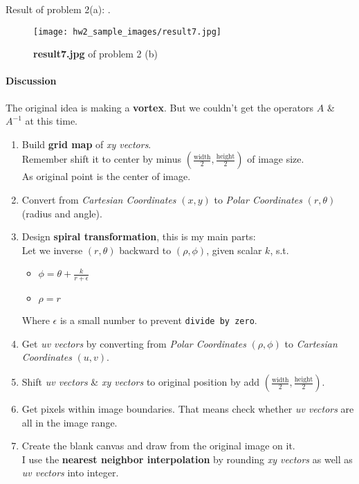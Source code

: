 Result of problem 2(a): .
\begin{figure}
    \centering
    \texttt{[image: hw2\_sample\_images/result7.jpg]}
    \caption{\textbf{result7.jpg} of problem 2 (b)}
    \label{result7}
\end{figure}

\paragraph{Discussion}

The original idea is making a \textbf{vortex}. But we couldn't get the operators $A$ \& $A^{-1}$ at this time.
\begin{enumerate}
    \item Build \textbf{grid map} of \textit{xy vectors}. \\
    Remember shift it to center by minus $(\frac{\mbox{width}}{2}, \frac{\mbox{height}}{2})$ of image size. \\
    As original point is the center of image.
    \item Convert from \textit{Cartesian Coordinates} $(x, y)$ to \textit{Polar Coordinates} $(r, \theta)$ (radius and angle).
    \item Design \textbf{spiral transformation}, this is my \alert{main parts}: \\
    Let we inverse $(r, \theta)$ backward to $(\rho, \phi)$, given scalar $k$, s.t.
    \begin{itemize}
        \item $\phi = \theta + \frac{k}{r + \epsilon}$
        \item $\rho = r$
    \end{itemize}
    Where $\epsilon$ is a small number to prevent \texttt{divide by zero}.
    \item Get \textit{uv vectors} by converting from \textit{Polar Coordinates} $(\rho, \phi)$ to \textit{Cartesian Coordinates} $(u, v)$.
    \item Shift \textit{uv vectors} \& \textit{xy vectors} to original position by add $(\frac{\mbox{width}}{2}, \frac{\mbox{height}}{2})$.
    \item Get pixels within image boundaries. That means check whether \textit{uv vectors} are all in the image range.
    \item Create the blank canvas and draw from the original image on it. \\
    I use the \textbf{nearest neighbor interpolation} by rounding \textit{xy vectors} as well as \textit{uv vectors} into integer.
\end{enumerate}

